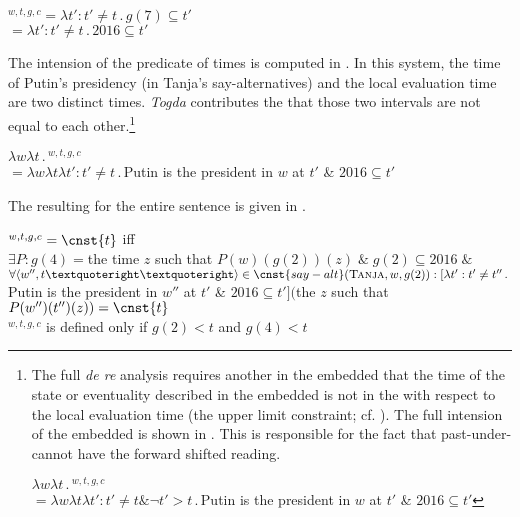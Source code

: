 \documentclass[output=paper,modfonts,newtxmath,hidelinks]{langscibook}
\begin{document}
\ea {}$^{w,t,g,c}$\tabto{2.3cm}${}=\lambda t':t'\neq t\,.\,g(7)\subseteq t'$\smallskip\\
\tabto{2.3cm}${}=\lambda t':t'\neq t\,.\,2016\subseteq t'$\label{20:ex38}
\z

\noindent The intension of the predicate of times is computed in . In this system, the time of Putin’s presidency (in Tanja’s say-alternatives) and the local evaluation time are two distinct times. \textit{Togda} contributes the  that those two intervals are not equal to each other.\footnote{\label{20:fn11}The full \textit{de re} analysis requires another  in the embedded  that the time of the state or eventuality described in the embedded  is not in the  with respect to the local evaluation time (the upper limit constraint; cf. \citealt{Abusch1997}). The full intension of the embedded  is shown in . This  is responsible for the fact that past-under- cannot have the forward shifted reading.

\ea $\lambda w\lambda t\,.\,$$^{w,t,g,c}$\\
\hspace{0.5cm}${}=\lambda w\lambda t\lambda t':t'\neq t \&\neg t'>t\,.\,{}$Putin is the president in $w$ at $t'$ \& $2016\subseteq t'$\label{20:fnex1}
\z
}

\ea $\lambda w\lambda t\,.\,$$^{w,t,g,c}$\smallskip\\
\hspace{0.5cm}${}=\lambda w\lambda t\lambda t':t'\neq t\,.\,{}$Putin is the president in $w$ at $t'$ \& $2016\subseteq t'$\label{20:ex39}
\z

\noindent The resulting  for the entire sentence is given in .

\ea {}$^{w,t,g,c}=\cnst{t}$ iff\smallskip\\
$\exists P:g(4)={}$the time $z$ such that $P(w)(g(2))(z)\;\&\;g(2)\subseteq 2016\;\&$\\
$\forall\langle w'',t’’\rangle\in\cnst{say-alt}(\textsc{Tanja},w,g(2)): [\lambda t':t'\neq t''\,.\,{}$Putin is the president in $w''$ at $t'$ \& $2016\subseteq t']($the $z$ such that $P(w'')(t'')(z)) =\cnst{t}$\medskip\\
$^{w,t,g,c}$  is defined only if $g(2)<t$ and $g(4)<t$\label{20:ex40}
\z
\end{document}
